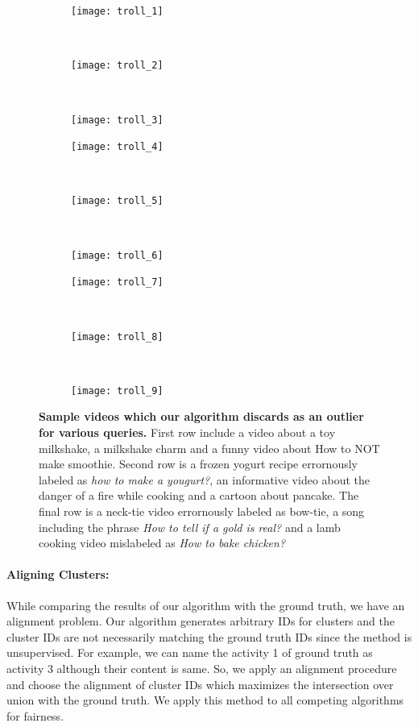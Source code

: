 \begin{figure}[ht]
  \begin{subfigure}[b]{0.16\textwidth}
    \texttt{[image: troll\_1]}
  \end{subfigure}~
  \begin{subfigure}[b]{0.16\textwidth}
    \texttt{[image: troll\_2]}
  \end{subfigure}~
  \begin{subfigure}[b]{0.16\textwidth}
    \texttt{[image: troll\_3]}
    \end{subfigure}

    \begin{subfigure}[b]{0.16\textwidth}
      \texttt{[image: troll\_4]}
    \end{subfigure}~
    \begin{subfigure}[b]{0.16\textwidth}
      \texttt{[image: troll\_5]}
    \end{subfigure}~
    \begin{subfigure}[b]{0.16\textwidth}
      \texttt{[image: troll\_6]}
  \end{subfigure}

  \begin{subfigure}[b]{0.16\textwidth}
    \texttt{[image: troll\_7]}
  \end{subfigure}~
  \begin{subfigure}[b]{0.16\textwidth}
    \texttt{[image: troll\_8]}
  \end{subfigure}~
  \begin{subfigure}[b]{0.16\textwidth}
    \texttt{[image: troll\_9]}
\end{subfigure}

\caption{\textbf{Sample videos which our algorithm discards as an outlier for various queries.}
First row include a video about a toy milkshake, a milkshake charm and a funny video about How to NOT make smoothie. Second row is a frozen yogurt recipe errornously labeled as \emph{how to make a yougurt?}, an informative video about the danger of a fire while cooking and a cartoon about pancake. The final row is a neck-tie video errornously labeled as bow-tie, a song including the phrase \emph{How to tell if a gold is real?} and a lamb cooking video mislabeled as \emph{How to bake chicken?}}
\label{outliers}
\end{figure}

\paragraph{Aligning Clusters:} While comparing the results of our algorithm with the ground truth, we have an alignment problem. Our algorithm generates arbitrary IDs for clusters and the cluster IDs are not necessarily matching the ground truth IDs since the method is unsupervised. For example, we can name the activity 1 of ground truth as activity 3 although their content is same. So, we apply an alignment procedure and choose the alignment of cluster IDs which maximizes the intersection over union with the ground truth. We apply this method to all competing algorithms for fairness.

